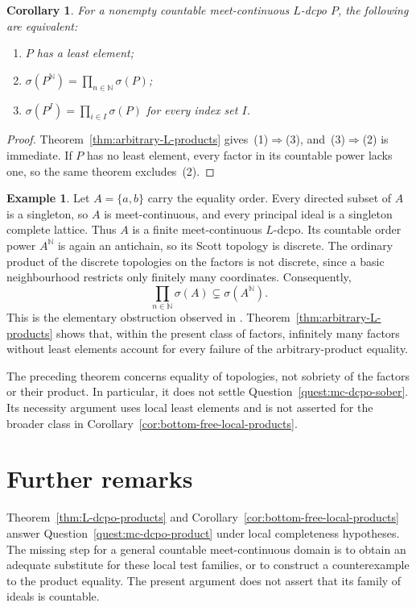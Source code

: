 \documentclass[11pt,reqno]{amsart}
\newtheorem{corollary}[theorem]{Corollary}
\theoremstyle{definition}
\newtheorem{example}[theorem]{Example}
\theoremstyle{remark}
\numberwithin{equation}{section}
\newcommand{\N}{\mathbb N}
\newcommand{\Sc}{\sigma}
\begin{document}
\begin{corollary}\label{cor:arbitrary-powers}
For a nonempty countable meet-continuous $L$-dcpo $P$, the following are equivalent:
\begin{enumerate}[label=\textup{(\arabic*)}]
\item $P$ has a least element;
\item $\Sc(P^{\N})=\prod_{n\in\N}\Sc(P)$;
\item $\Sc(P^I)=\prod_{i\in I}\Sc(P)$ for every index set $I$.
\end{enumerate}
\end{corollary}
\begin{proof}
Theorem~\ref{thm:arbitrary-L-products} gives~(1)$\Rightarrow$(3), and~(3)$\Rightarrow$(2) is immediate. If $P$ has no least element, every factor in its countable power lacks one, so the same theorem excludes~(2).
\end{proof}

\begin{example}\label{ex:antichain-infinite-product}
Let $A=\{a,b\}$ carry the equality order. Every directed subset of $A$ is a singleton, so $A$ is meet-continuous, and every principal ideal is a singleton complete lattice. Thus $A$ is a finite meet-continuous $L$-dcpo. Its countable order power $A^{\N}$ is again an antichain, so its Scott topology is discrete. The ordinary product of the discrete topologies on the factors is not discrete, since a basic neighbourhood restricts only finitely many coordinates. Consequently,
\[
 \prod_{n\in\N}\Sc(A)\subsetneq\Sc(A^{\N}).
\]
This is the elementary obstruction observed in \cite[Section~5]{XuJi}. Theorem~\ref{thm:arbitrary-L-products} shows that, within the present class of factors, infinitely many factors without least elements account for every failure of the arbitrary-product equality.
\end{example}

The preceding theorem concerns equality of topologies, not sobriety of the factors or their product. In particular, it does not settle Question~\ref{quest:mc-dcpo-sober}. Its necessity argument uses local least elements and is not asserted for the broader class in Corollary~\ref{cor:bottom-free-local-products}.

\section{Further remarks}
Theorem~\ref{thm:L-dcpo-products} and Corollary~\ref{cor:bottom-free-local-products} answer Question~\ref{quest:mc-dcpo-product} under local completeness hypotheses. The missing step for a general countable meet-continuous domain is to obtain an adequate substitute for these local test families, or to construct a counterexample to the product equality. The present argument does not assert that its family of ideals is countable.
\end{document}
